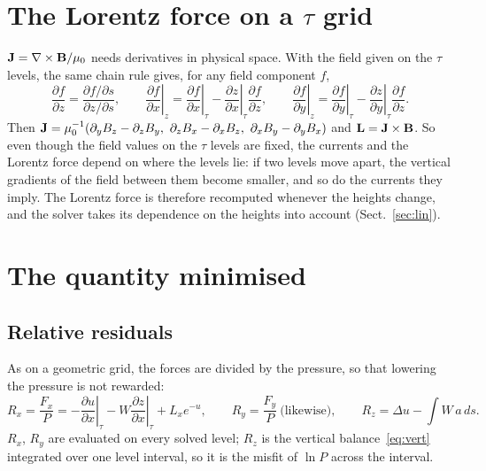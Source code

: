 \section{\texorpdfstring{The Lorentz force on a $\tau$ grid}{The Lorentz force on a tau grid}}\label{sec:lorentz}
$\mathbf J=\nabla\times\mathbf B/\mu_0$ needs derivatives in physical space. With the field given on the $\tau$ levels, the same chain rule
gives, for any field component $f$,
\begin{equation}
\frac{\partial f}{\partial z}=\frac{\partial f/\partial s}{\partial z/\partial s},\qquad
\left.\frac{\partial f}{\partial x}\right|_z=\left.\frac{\partial f}{\partial x}\right|_\tau-\left.\frac{\partial z}{\partial x}\right|_\tau\frac{\partial f}{\partial z},\qquad
\left.\frac{\partial f}{\partial y}\right|_z=\left.\frac{\partial f}{\partial y}\right|_\tau-\left.\frac{\partial z}{\partial y}\right|_\tau\frac{\partial f}{\partial z}.
\label{eq:curvi}
\end{equation}
Then $\J=\mu_0^{-1}(\partial_yB_z-\partial_zB_y,\ \partial_zB_x-\partial_xB_z,\ \partial_xB_y-\partial_yB_x)$ and
$\mathbf L=\mathbf J\times\mathbf B$. So even though the field values on the $\tau$ levels are fixed, the currents and the Lorentz force depend on
where the levels lie: if two levels move apart, the vertical gradients of the field between them become smaller, and so do the
currents they imply. The Lorentz force is therefore recomputed whenever the heights change, and the solver takes its
dependence on the heights into account (Sect.~\ref{sec:lin}).

\section{The quantity minimised}\label{sec:obj}
\subsection{Relative residuals}
As on a geometric grid, the forces are divided by the pressure, so that lowering the pressure is not rewarded:
\begin{equation}
R_x=\frac{F_x}{P}=-\left.\frac{\partial u}{\partial x}\right|_\tau-W\left.\frac{\partial z}{\partial x}\right|_\tau+L_xe^{-u},\qquad
R_y=\frac{F_y}{P}\ \text{(likewise)},\qquad
R_z=\Delta u-\int W\,a\,ds .\label{eq:R}
\end{equation}
$R_x$, $R_y$ are evaluated on every solved level; $R_z$ is the vertical balance~\eqref{eq:vert} integrated over one level
interval, so it is the misfit of $\ln P$ across the interval.


